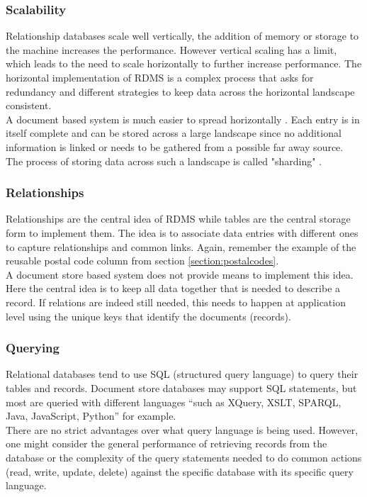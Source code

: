 \subsubsection{Scalability}
Relationship databases scale well vertically, the addition of memory or storage to the machine increases the performance. However vertical scaling has a limit, which leads to the need to scale horizontally to further increase performance. The horizontal implementation of RDMS is a complex process that asks for redundancy and different strategies to keep data across the horizontal landscape consistent.\\
A document based system is much easier to spread horizontally \parencite{ian2016}\parencite{objelean}. Each entry is in itself complete and can be stored across a large landscape since no additional information is linked or needs to be gathered from a possible far away source. The process of storing data across such a landscape is called "sharding" \parencite{ian2016}.
\subsubsection{Relationships}
Relationships are the central idea of RDMS while tables are the central storage form to implement them. The idea is to associate data entries with different ones to capture relationships and common links. Again, remember the example of the reusable postal code column from section \ref{section:postalcodes}.\\
A document store based system does not provide means to implement this idea. Here the central idea is to keep all data together that is needed to describe a record. If relations are indeed still needed, this needs to happen at application level \parencite{ian2016} using the unique keys that identify the documents (records).
\subsubsection{Querying}
Relational databases tend to use SQL (structured query language) to query their tables and records. Document store databases may support SQL statements, but most are queried with different languages “such as XQuery, XSLT, SPARQL, Java, JavaScript, Python” \parencite{ian2016} for example.\\
There are no strict advantages over what query language is being used. However, one might consider the general performance of retrieving records from the database or the complexity of the query statements needed to do common actions (read, write, update, delete) against the specific database with its specific query language.
